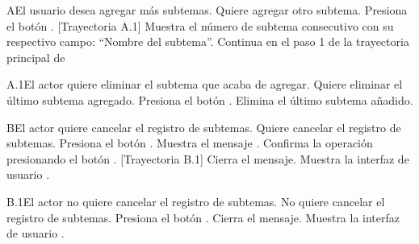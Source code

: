 
\begin{UCtrayectoriaA}{A}{El usuario desea agregar más subtemas.}
    \UCpaso[\UCactor] Quiere agregar otro subtema.
    \UCpaso[\UCactor] Presiona el botón . [Trayectoria A.1]
    \UCpaso Muestra el número de subtema consecutivo con su respectivo campo: ``Nombre del subtema''.
    \UCpaso Continua en el paso 1 de la trayectoria principal de 
\end{UCtrayectoriaA}


\begin{UCtrayectoriaA}{A.1}{El actor quiere eliminar el subtema que acaba de agregar.}
    \UCpaso[\UCactor] Quiere eliminar el último subtema agregado.
    \UCpaso[\UCactor] Presiona el botón .
    \UCpaso Elimina el último subtema añadido. 
\end{UCtrayectoriaA}


\begin{UCtrayectoriaA}{B}{El actor quiere cancelar el registro de subtemas.}
    \UCpaso[\UCactor] Quiere cancelar el registro de subtemas.
    \UCpaso[\UCactor] Presiona el botón .
    \UCpaso Muestra el mensaje .
    \UCpaso[\UCactor] Confirma la operación presionando el botón . [Trayectoria B.1] 
    \UCpaso Cierra el mensaje. 
    \UCpaso Muestra la interfaz de usuario .
\end{UCtrayectoriaA}


\begin{UCtrayectoriaA}{B.1}{El actor no quiere cancelar el registro de subtemas.}
    \UCpaso[\UCactor] No quiere cancelar el registro de subtemas.
    \UCpaso[\UCactor] Presiona el botón .
    \UCpaso Cierra el mensaje. 
    \UCpaso Muestra la interfaz de usuario .
\end{UCtrayectoriaA}

